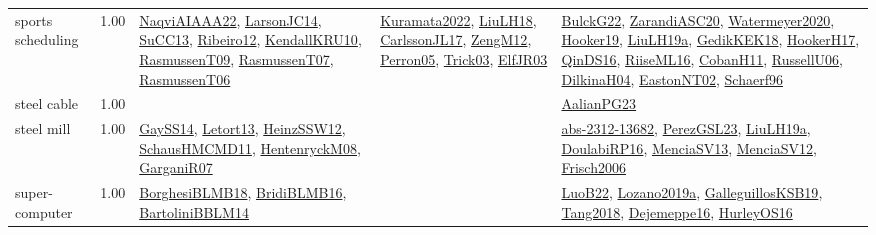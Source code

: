 {\begin{longtable}{p{3cm}r>{\raggedright\arraybackslash}p{6cm}>{\raggedright\arraybackslash}p{6cm}>{\raggedright\arraybackslash}p{8cm}}
\index{sports scheduling}\index{ApplicationAreas!sports scheduling}sports scheduling &  1.00 & \hyperref[detail:NaqviAIAAA22]{NaqviAIAAA22}, \hyperref[detail:LarsonJC14]{LarsonJC14}, \hyperref[detail:SuCC13]{SuCC13}, \hyperref[detail:Ribeiro12]{Ribeiro12}, \hyperref[detail:KendallKRU10]{KendallKRU10}, \hyperref[detail:RasmussenT09]{RasmussenT09}, \hyperref[detail:RasmussenT07]{RasmussenT07}, \hyperref[detail:RasmussenT06]{RasmussenT06} & \hyperref[detail:Kuramata2022]{Kuramata2022}, \hyperref[detail:LiuLH18]{LiuLH18}, \hyperref[detail:CarlssonJL17]{CarlssonJL17}, \hyperref[detail:ZengM12]{ZengM12}, \hyperref[detail:Perron05]{Perron05}, \hyperref[detail:Trick03]{Trick03}, \hyperref[detail:ElfJR03]{ElfJR03} & \hyperref[detail:BulckG22]{BulckG22}, \hyperref[detail:ZarandiASC20]{ZarandiASC20}, \hyperref[detail:Watermeyer2020]{Watermeyer2020}, \hyperref[detail:Hooker19]{Hooker19}, \hyperref[detail:LiuLH19a]{LiuLH19a}, \hyperref[detail:GedikKEK18]{GedikKEK18}, \hyperref[detail:HookerH17]{HookerH17}, \hyperref[detail:QinDS16]{QinDS16}, \hyperref[detail:RiiseML16]{RiiseML16}, \hyperref[detail:CobanH11]{CobanH11}, \hyperref[detail:RussellU06]{RussellU06}, \hyperref[detail:DilkinaH04]{DilkinaH04}, \hyperref[detail:EastonNT02]{EastonNT02}, \hyperref[detail:Schaerf96]{Schaerf96}\\
\index{steel cable}\index{ApplicationAreas!steel cable}steel cable &  1.00 &  &  & \hyperref[detail:AalianPG23]{AalianPG23}\\
\index{steel mill}\index{ApplicationAreas!steel mill}steel mill &  1.00 & \hyperref[detail:GaySS14]{GaySS14}, \hyperref[detail:Letort13]{Letort13}, \hyperref[detail:HeinzSSW12]{HeinzSSW12}, \hyperref[detail:SchausHMCMD11]{SchausHMCMD11}, \hyperref[detail:HentenryckM08]{HentenryckM08}, \hyperref[detail:GarganiR07]{GarganiR07} &  & \hyperref[detail:abs-2312-13682]{abs-2312-13682}, \hyperref[detail:PerezGSL23]{PerezGSL23}, \hyperref[detail:LiuLH19a]{LiuLH19a}, \hyperref[detail:DoulabiRP16]{DoulabiRP16}, \hyperref[detail:MenciaSV13]{MenciaSV13}, \hyperref[detail:MenciaSV12]{MenciaSV12}, \hyperref[detail:Frisch2006]{Frisch2006}\\
\index{super-computer}\index{ApplicationAreas!super-computer}super-computer &  1.00 & \hyperref[detail:BorghesiBLMB18]{BorghesiBLMB18}, \hyperref[detail:BridiBLMB16]{BridiBLMB16}, \hyperref[detail:BartoliniBBLM14]{BartoliniBBLM14} &  & \hyperref[detail:LuoB22]{LuoB22}, \hyperref[detail:Lozano2019a]{Lozano2019a}, \hyperref[detail:GalleguillosKSB19]{GalleguillosKSB19}, \hyperref[detail:Tang2018]{Tang2018}, \hyperref[detail:Dejemeppe16]{Dejemeppe16}, \hyperref[detail:HurleyOS16]{HurleyOS16}\\

\end{longtable}}
